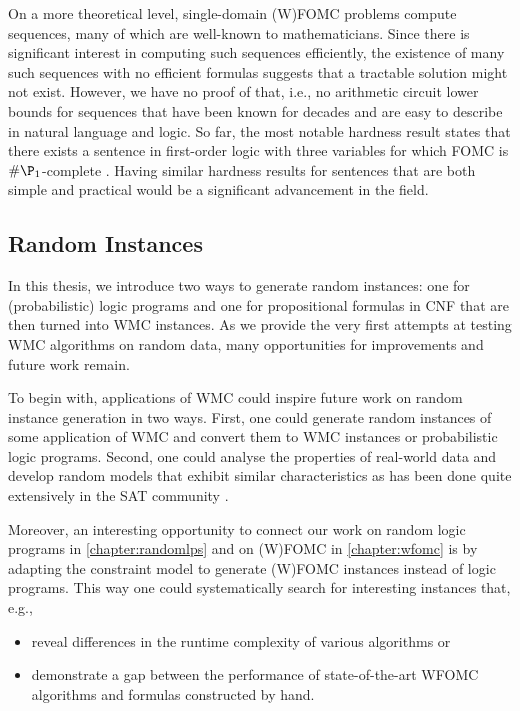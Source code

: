 On a more theoretical level, single-domain (W)FOMC problems compute sequences,
many of which are well-known to mathematicians. Since there is significant
interest in computing such sequences efficiently, the existence of many such
sequences with no efficient formulas suggests that a tractable solution might
not exist. However, we have no proof of that, i.e., no arithmetic circuit lower
bounds for sequences that have been known for decades and are easy to describe
in natural language and logic. So far, the most notable hardness result
states that there exists a sentence in first-order logic with three variables
for which FOMC is $\#\P_1$-complete \citep{DBLP:conf/pods/BeameBGS15}. Having
similar hardness results for sentences that are both simple and practical would
be a significant advancement in the field.

\subsection{Random Instances}

In this thesis, we introduce two ways to generate random instances: one for
(probabilistic) logic programs and one for propositional formulas in CNF that
are then turned into WMC instances. As we provide the very first attempts at
testing WMC algorithms on random data, many opportunities for improvements and
future work remain.

To begin with, applications of WMC could inspire future work on random instance
generation in two ways. First, one could generate random instances of some
application of WMC and convert them to WMC instances or probabilistic logic
programs. Second, one could analyse the properties of real-world data and
develop random models that exhibit similar characteristics as has been done
quite extensively in the SAT community
\citep{DBLP:conf/ijcai/AnsoteguiBL09,DBLP:conf/tacas/BlasiusFS19,DBLP:journals/ai/Giraldez-CruL16,DBLP:conf/ijcai/Giraldez-CruL17}.

Moreover, an interesting opportunity to connect our work on random logic
programs in \cref{chapter:randomlps} and on (W)FOMC in \cref{chapter:wfomc} is
by adapting the constraint model to generate (W)FOMC instances instead of logic
programs. This way one could systematically search for interesting instances
that, e.g.,
\begin{itemize}
  \item reveal differences in the runtime complexity of various algorithms or
  \item demonstrate a gap between the performance of state-of-the-art WFOMC
        algorithms and formulas constructed by hand.
\end{itemize}


